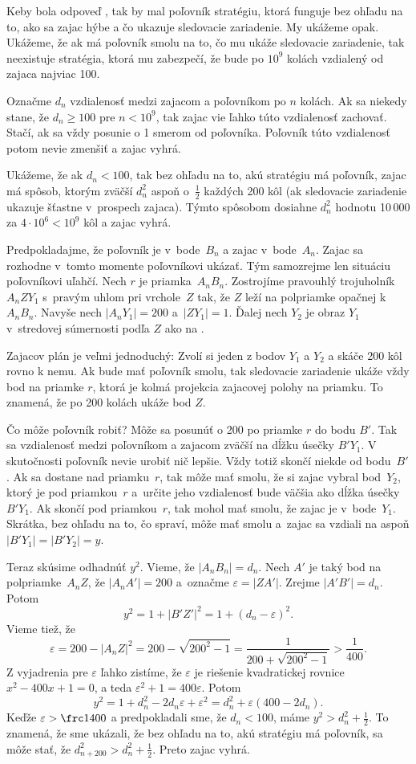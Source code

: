 {%
Keby bola odpoveď , tak by mal poľovník stratégiu, ktorá funguje bez ohľadu na to, ako sa zajac hýbe a čo ukazuje sledovacie zariadenie. My ukážeme opak. Ukážeme, že ak má poľovník smolu na to, čo mu ukáže sledovacie zariadenie, tak neexistuje stratégia, ktorá mu zabezpečí, že bude po $10^9$ kolách vzdialený od zajaca najviac 100.

Označme $d_n$ vzdialenosť medzi zajacom a poľovníkom po $n$ kolách. Ak sa niekedy stane, že $d_n\ge 100$ pre $n<10^9$, tak zajac vie ľahko túto vzdialenosť zachovať. Stačí, ak sa vždy posunie o 1 smerom od poľovníka. Poľovník túto vzdialenosť potom nevie zmenšiť a zajac vyhrá.

Ukážeme, že ak $d_n<100$, tak bez ohľadu na to, akú stratégiu má poľovník, zajac má spôsob, ktorým zväčší $d_n^2$ aspoň o~$\frac12$ každých 200 kôl (ak sledovacie zariadenie ukazuje šťastne v~prospech zajaca). Týmto spôsobom dosiahne $d_n^2$ hodnotu 10\,000 za $4\cdot 10^6<10^9$ kôl a zajac vyhrá.

Predpokladajme, že poľovník je v~bode~$B_n$ a zajac v~bode~$A_n$. Zajac sa rozhodne v~tomto momente poľovníkovi ukázať. Tým samozrejme len situáciu poľovníkovi uľahčí. Nech $r$ je priamka~$A_nB_n$. Zostrojíme pravouhlý trojuholník $A_nZY_1$ s~pravým uhlom pri vrchole~$Z$ tak, že $Z$ leží na polpriamke opačnej k~$A_nB_n$. Navyše nech $|A_nY_1|=200$ a~$|ZY_1|=1$. Ďalej nech $Y_2$ je obraz $Y_1$ v~stredovej súmernosti podľa $Z$ ako na \obr.
%

Zajacov plán je veľmi jednoduchý: Zvolí si jeden z bodov $Y_1$ a $Y_2$ a skáče 200 kôl rovno k nemu. Ak bude mať poľovník smolu, tak sledovacie zariadenie ukáže vždy bod na priamke $r$, ktorá je kolmá projekcia zajacovej polohy na priamku. To znamená, že po 200 kolách ukáže bod $Z$.

Čo môže poľovník robiť? Môže sa posunúť o 200 po priamke $r$ do bodu $B'$. Tak sa vzdialenosť medzi poľovníkom a zajacom zväčší na dĺžku úsečky $B'Y_1$. V skutočnosti poľovník nevie urobiť nič lepšie. Vždy totiž skončí niekde  od bodu~$B'$. Ak sa dostane nad priamku~$r$, tak môže mať smolu, že si zajac vybral bod~$Y_2$, ktorý je pod priamkou~$r$ a~určite jeho vzdialenosť bude väčšia ako dĺžka úsečky~$B'Y_1$. Ak skončí pod priamkou~$r$, tak mohol mať smolu, že zajac je v~bode~$Y_1$. Skrátka, bez ohľadu na to, čo spraví, môže mať smolu a~zajac sa vzdiali na aspoň $|B'Y_1|=|B'Y_2|=y$.

Teraz skúsime odhadnúť $y^2$. Vieme, že $|A_nB_n|=d_n$. Nech $A'$ je taký bod na polpriamke~$A_nZ$, že $|A_nA'|=200$ a~označme $\varepsilon=|ZA'|$. Zrejme $|A'B'|=d_n$. Potom
$$
y^2=1+|B'Z'|^2=1+(d_n-\varepsilon)^2.
$$
Vieme tiež, že
$$
\varepsilon=200-|A_nZ|^2=200-\sqrt{200^2-1}=\frac1{200+\sqrt{200^2-1}}>\frac1{400}.
$$
Z vyjadrenia pre $\varepsilon$ ľahko zistíme, že $\varepsilon$ je riešenie kvadratickej rovnice $x^2-400x+1=0$, a teda $\varepsilon^2+1=400\varepsilon$. Potom
$$
y^2=1+d_n^2-2d_n\varepsilon+\varepsilon^2=d_n^2+\varepsilon(400-2d_n).
$$
Keďže $\varepsilon>\frc1{400}$ a predpokladali sme, že $d_n<100$, máme $y^2>d_n^2+\frac12$. To znamená, že sme ukázali, že bez ohľadu na to, akú stratégiu má poľovník, sa môže stať, že $d_{n+200}^2>d_n^2+\frac12$. Preto zajac vyhrá.}

